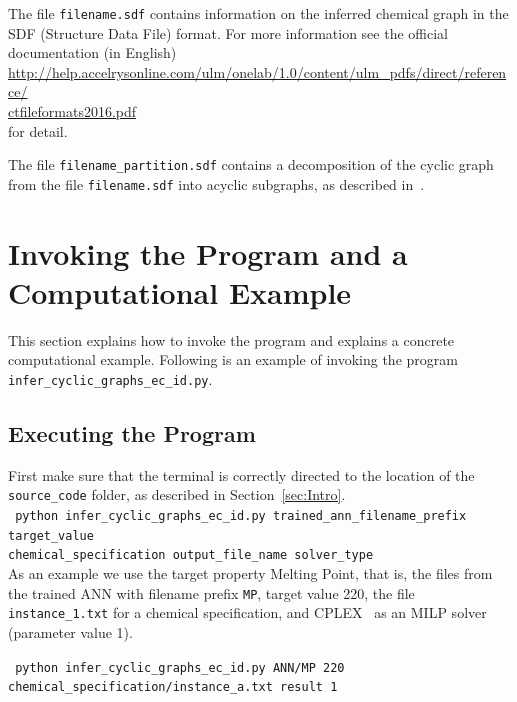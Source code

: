 \documentclass[11pt, titlepage, dvipdfmx, twoside]{article}
\begin{document}
\noindent
The file {\tt filename.sdf} contains information
on the inferred chemical graph in the SDF (Structure Data File)
format.
For more information see the official documentation (in English) \\
\url{http://help.accelrysonline.com/ulm/onelab/1.0/content/ulm_pdfs/direct/reference/}\\
 \url{ctfileformats2016.pdf} \\
for detail.

\noindent
The file {\tt filename\_partition.sdf} contains a 
decomposition of the cyclic graph from the 
file {\tt filename.sdf} into acyclic subgraphs,
as described in~\cite{cyclic_BH_arxiv}.



\section{Invoking the Program and a Computational Example}
\label{sec:Exp}

This section explains how to invoke the program
and explains a concrete computational example.
Following is an example of invoking the
program {\tt infer\_cyclic\_graphs\_ec\_id.py}.

 


\subsection{Executing the Program}
\label{sec:Exp_1}

First make sure that the terminal is 
correctly directed to the location
of the {\tt source\_code} folder, as described in Section~\ref{sec:Intro}. \\

\noindent
{\tt 
 python  infer\_cyclic\_graphs\_ec\_id.py 
trained\_ann\_filename\_prefix
target\_value \\
 \phantom{python } 
 chemical\_specification
output\_file\_name
solver\_type
 }\\


As an example we use the target property Melting Point, 
that is, the files from the trained ANN with filename prefix {\tt MP},
target value 220,
the file {\tt instance\_1.txt} for a chemical specification,
and CPLEX~\cite{cplex} as an MILP solver (parameter value 1).

{\tt 
 python infer\_cyclic\_graphs\_ec\_id.py 
ANN/MP
220 \\
 \phantom{python } 
chemical\_specification/instance\_a.txt
result
1
 }\\
\end{document}
